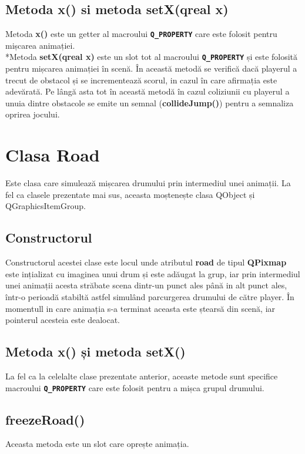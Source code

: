 \documentclass{article}
\begin{document}
\subsection{Metoda x() si metoda setX(qreal x)}
Metoda \textbf{x()} este un getter al macroului \textbf{\texttt{Q\_PROPERTY}} care este folosit pentru mișcarea animației. 
\\*Metoda \textbf{setX(qreal x)} este un slot tot al macroului \textbf{\texttt{Q\_PROPERTY}} și este folosită pentru mișcarea animației în scenă. În această metodă se verifică dacă playerul a trecut de obstacol și se incrementează scorul, in cazul în care afirmația este adevărată. Pe lângă asta tot în această metodă în cazul coliziunii cu playerul a unuia dintre obstacole se emite un semnal (\textbf{collideJump()}) pentru a semnaliza oprirea jocului.

\section{Clasa Road} 
Este clasa care simulează mișcarea drumului prin intermediul unei animații. La fel ca clasele prezentate mai sus, aceasta moștenește clasa QObject și QGraphicsItemGroup.

\subsection{Constructorul}
Constructorul acestei clase este locul unde atributul \textbf{road} de tipul \textbf{QPixmap} este ințializat cu imaginea unui drum și este adăugat la grup, iar prin intermediul unei animații acesta străbate scena dintr-un punct ales până in alt punct ales, într-o perioadă stabiltă astfel simulând parcurgerea drumului de către player. În momentull in care animația s-a terminat  aceasta este ștearsă din scenă, iar pointerul acesteia este dealocat.

\subsection{Metoda x() și metoda setX()}
La fel ca la celelalte clase prezentate anterior, aceaste metode sunt specifice macroului \textbf{\texttt{Q\_PROPERTY}} care este folosit pentru a mișca grupul drumului.

\subsection{freezeRoad()}
Aceasta metoda este  un slot care oprește animația.
\end{document}
